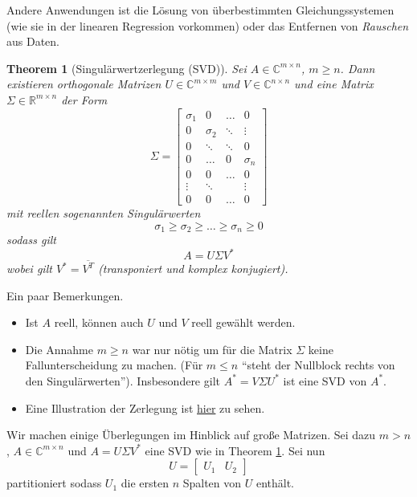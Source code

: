 \documentclass[
]{book}
\providecommand{\tightlist}{%
  \setlength{\itemsep}{0pt}\setlength{\parskip}{0pt}}
\newtheorem{theorem}{Theorem}[chapter]
\theoremstyle{definition}
\theoremstyle{definition}
\theoremstyle{definition}
\theoremstyle{definition}
\theoremstyle{remark}
\begin{document}
Andere Anwendungen ist die Lösung von überbestimmten
Gleichungssystemen (wie sie in der linearen Regression vorkommen) oder das
Entfernen von \emph{Rauschen} aus Daten.

\begin{theorem}[Singulärwertzerlegung (SVD)]
\protect\hypertarget{thm:SVD}{}\label{thm:SVD}Sei \(A\in \mathbb C^{m\times n}\), \(m\geq n\). Dann existieren orthogonale Matrizen \(U \in \mathbb C^{m\times m}\) und \(V\in \mathbb C^{n\times n}\) und eine Matrix \(\Sigma \in \mathbb R^{m\times n}\) der Form
\begin{equation*}
\Sigma = 
\begin{bmatrix}
\sigma_1 & 0 & \dots & 0\\
0 & \sigma_2 &\ddots & \vdots\\
0 & \ddots & \ddots &0\\
  0 & \dots&0 & \sigma_n \\
  0 & 0 & \dots & 0 \\
  \vdots & \ddots &  & \vdots\\
  0 & 0 & \dots & 0
\end{bmatrix}
\end{equation*}
mit reellen sogenannten \emph{Singulärwerten}
\begin{equation*}
\sigma_1 \geq \sigma_2 \geq \dots \geq \sigma_n \geq 0
\end{equation*}
sodass gilt
\begin{equation*}
A = U \Sigma V^*
\end{equation*}
wobei gilt \(V^* = \overline{V^T}\) (transponiert und komplex konjugiert).
\end{theorem}

Ein paar Bemerkungen.

\begin{itemize}
\tightlist
\item
  Ist \(A\) reell, können auch \(U\) und \(V\) reell gewählt werden.
\item
  Die Annahme \(m \geq n\) war nur nötig um für die Matrix \(\Sigma\) keine Fallunterscheidung zu machen. (Für \(m\leq n\) ``steht der Nullblock rechts von den Singulärwerten''). Insbesondere gilt \(A^* = V\Sigma U^*\) ist eine SVD von \(A^*\).
\item
  Eine Illustration der Zerlegung ist \href{@fig-SVD}{hier} zu sehen.
\end{itemize}

Wir machen einige Überlegungen im Hinblick auf große Matrizen. Sei dazu \(m>n\), \(A\in \mathbb C^{m\times n}\) und \(A=U\Sigma V^*\) eine SVD wie in Theorem \ref{thm:SVD}. Sei nun
\begin{equation*}
U = \begin{bmatrix}
U_1 & U_2
\end{bmatrix}
\end{equation*}
partitioniert sodass \(U_1\) die ersten \(n\) Spalten von \(U\) enthält.
\end{document}
